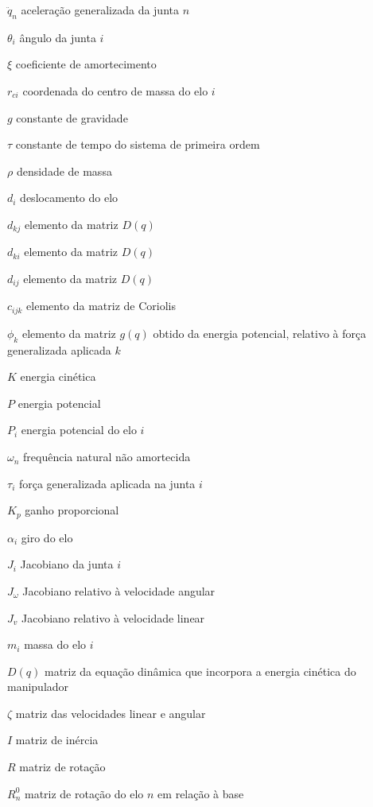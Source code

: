 \begin{simbolos}
	\item[$ \ddot{q}_n $] 	aceleração generalizada da junta $n$
	\item[$ \theta_i $] 	ângulo da junta $i$
	\item[$\xi$]		coeficiente de amortecimento
	\item[$ r_{ci} $]	coordenada do centro de massa do elo $i$
	\item[$ g $]		constante de gravidade
	\item[$\tau$]		constante de tempo do sistema de primeira ordem
	\item[$ \rho $]		densidade de massa
	\item[$ d_i $]		deslocamento do elo
	\item[$ d_{kj} $]	elemento da matriz $D(q)$
	\item[$ d_{ki} $]	elemento da matriz $D(q)$
	\item[$ d_{ij} $]	elemento da matriz $D(q)$
	\item[$ c_{ijk} $]	elemento da matriz de Coriolis
	\item[$ \phi_k $]	elemento da matriz $g(q)$ obtido da energia potencial, relativo à força generalizada aplicada $k$
	\item[$ K $]		energia cinética
	\item[$ P $]		energia potencial
	\item[$ P_i $]		energia potencial do elo $i$
	\item[$\omega_n$]	frequência natural não amortecida
	\item[$ \tau_i $]	força generalizada aplicada na junta $i$
	\item[$K_p$]		ganho proporcional
	\item[$ \alpha_i $]	giro do elo
	\item[$ J_i $]		Jacobiano da junta $i$
	\item[$ J_{\omega} $]	Jacobiano relativo à velocidade angular
	\item[$ J_v $]		Jacobiano relativo à velocidade linear
	\item[$ m_i $]		massa do elo $i$
	\item[$ D(q) $]		matriz da equação dinâmica que incorpora a energia cinética do manipulador
	\item[$ \zeta $]	matriz das velocidades linear e angular
	\item[$ I $]		matriz de inércia
	\item[$ R $]		matriz de rotação
	\item[$ R_n^0 $]	matriz de rotação do elo $n$ em relação à base

\end{simbolos}
